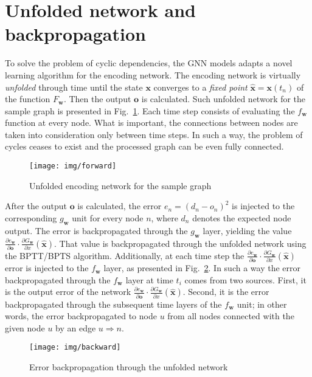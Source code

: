 \section{Unfolded network and backpropagation}
To solve the problem of cyclic dependencies, the GNN models adapts a novel learning algorithm for the encoding network. The encoding network is virtually \emph{unfolded} through time until the state $\bm{x}$ converges to a \emph{fixed point} $\hat{\bm{x}} = \bm{x}(t_n)$ of the function  $F_{\bm{w}}$. Then the output $\bm{o}$ is calculated. Such unfolded network for the sample graph is presented in Fig.~\ref{fig:gnn_forward}. Each time step consists of evaluating the $f_{\bm{w}}$ function at every node. What is important, the connections between nodes are taken into consideration only between time steps. In such a way, the problem of cycles ceases to exist and the processed graph can be even fully connected.

\begin{figure}[h!]
\begin{center}
	\texttt{[image: img/forward]}
	\caption{Unfolded encoding network for the sample graph}
	\label{fig:gnn_forward}
\end{center}
\end{figure}

After the output $\bm{o}$ is calculated, the error $e_n = (d_n - o_n)^2$ is injected to the corresponding $g_{\bm{w}}$ unit for every node $n$, where $d_n$ denotes the expected node output. The error is backpropagated through the $g_{\bm{w}}$ layer, yielding the value $\frac{\partial e_{\bm{w}}}{\partial \bm{o}}\cdot \frac{\partial G_{\bm{w}}}{\partial x}(\hat{\bm{x}})$. That value is backpropagated through the unfolded network using the BPTT/BPTS algorithm. Additionally, at each time step the $\frac{\partial e_{\bm{w}}}{\partial \bm{o}}\cdot \frac{\partial G_{\bm{w}}}{\partial x}(\hat{\bm{x}})$ error is injected to the $f_{\bm{w}}$ layer, as presented in Fig.~\ref{fig:gnn_backward}. In such a way the error backpropagated through the $f_{\bm{w}}$ layer at time $t_i$ comes from two sources. First, it is the output error of the network $\frac{\partial e_{\bm{w}}}{\partial \bm{o}}\cdot \frac{\partial G_{\bm{w}}}{\partial x}(\hat{\bm{x}})$. Second, it is the error backpropagated through the subsequent time layers of the $f_{\bm{w}}$ unit; in other words, the error backpropagated to node $u$ from all nodes connected with the given node $u$ by an edge $u \Rightarrow n$.

\begin{figure}[h!]
\begin{center}
	\texttt{[image: img/backward]}
	\caption{Error backpropagation through the unfolded network}
	\label{fig:gnn_backward}
\end{center}
\end{figure}

